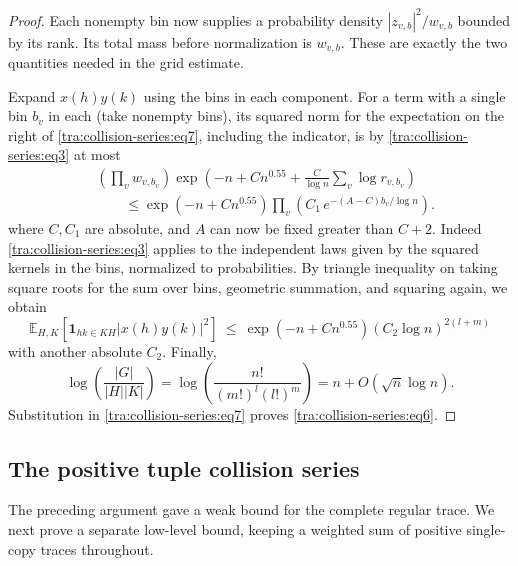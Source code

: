 \begin{proof}
Each nonempty bin now supplies a probability density $|z_{v,b}|^2/w_{v,b}$ bounded by its rank. Its total mass before normalization is $w_{v,b}$. These are exactly the two quantities needed in the grid estimate.

Expand \(x(h)y(k)\) using the bins in each component. For a term with a single bin \(b_v\) in each (take nonempty bins), its squared norm for the expectation on the right of \eqref{tra:collision-series:eq7}, including the indicator, is by \eqref{tra:collision-series:eq3} at most
\[
\begin{aligned}
&\left(\prod_v w_{v,b_v}\right)
\exp\left(-n+C n^{0.55}+\frac{C}{\log n}\sum_v \log r_{v,b_v}\right)\\
&\qquad\le
\exp(-n+C n^{0.55})\prod_v \left(C_1\, e^{-(A-C)b_v/\log n}\right).
\end{aligned}
\]
where \(C,C_1\) are absolute, and \(A\) can now be fixed greater than \(C+2\). Indeed \eqref{tra:collision-series:eq3} applies to the independent laws given by the squared kernels in the bins, normalized to probabilities. By triangle inequality on taking square roots for the sum over bins, geometric summation, and squaring again, we obtain
\[
\mathbb E_{H,K}\!\left[{\boldsymbol 1}_{hk\in KH}|x(h)y(k)|^2\right]
\ \le\
\exp(-n+C n^{0.55})\left(C_2\log n\right)^{2(l+m)}
\]
with another absolute \(C_2\). Finally,
\[
\log\left(\frac{|G|}{|H||K|}\right)=
\log\left(\frac{n!}{(m!)^l(l!)^m}\right)=n+O(\sqrt n\log n).
\]
Substitution in \eqref{tra:collision-series:eq7} proves \eqref{tra:collision-series:eq6}.
\end{proof}
\subsection{The positive tuple collision series}
\label{tra:collision-series:representation-normalization}
The preceding argument gave a weak bound for the complete regular trace. We next prove a separate low-level bound, keeping a weighted sum of positive single-copy traces throughout.


